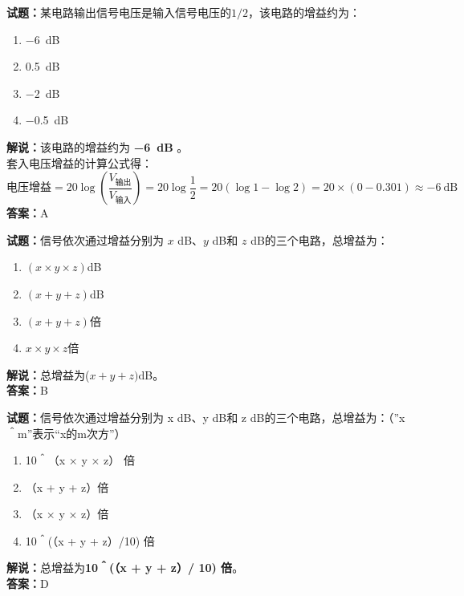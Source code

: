 \documentclass{ctexbook}
\begin{document}
\vspace{\baselineskip}

\noindent\textbf{试题：}某电路输出信号电压是输入信号电压的\(1/2\)，该电路的增益约为：
\begin{enumerate}[leftmargin=3em]
  \item \SI{-6}{\dB}
  \item \SI{0.5}{\dB}
  \item \SI{-2}{\dB}
  \item \SI{-0.5}{\dB}
\end{enumerate}
\noindent\textbf{解说：}该电路的增益约为\textbf{ \SI{-6}{\dB} }。\\
套入电压增益的计算公式得：
$$\mbox{电压增益}=20 \log \left( {\frac{V_{ \mbox{输出} }}{V_{ \mbox{输入} }}} \right)=20 \log \frac{1}{2}=20 \left( \log 1 - \log 2 \right) = 20 \times \left( 0 - 0.301 \right) \approx -6 \ \mathrm{dB}$$
\noindent\textbf{答案：}A

\vspace{\baselineskip}

\noindent\textbf{试题：}信号依次通过增益分别为 \(x\) \si{\dB}、\(y\) \si{\dB}和 \(z\) \si{\dB}的三个电路，总增益为：
\begin{enumerate}[leftmargin=3em]
  \item \((x \times y \times z)\)\si{\dB}
  \item \((x + y + z)\)\si{\dB}
  \item \((x + y + z)\)倍
  \item \(x \times y \times z\)倍
\end{enumerate}
\noindent\textbf{解说：}总增益为(\(x + y + z)\)\si{\dB}。\\\noindent\textbf{答案：}B

\vspace{\baselineskip}

\noindent\textbf{试题：}信号依次通过增益分别为 x dB、y dB和 z dB的三个电路，总增益为：（”x＾m”表示“x的m次方”）
\begin{enumerate}[leftmargin=3em]
  \item 10＾（x × y × z） 倍
  \item （x + y + z）倍
  \item （x × y × z）倍
  \item 10＾(（x + y + z）/10) 倍
\end{enumerate}
\noindent\textbf{解说：}总增益为\textbf{10＾(（x + y + z）/ 10) 倍}。\\\noindent\textbf{答案：}D

\vspace{\baselineskip}
\end{document}
